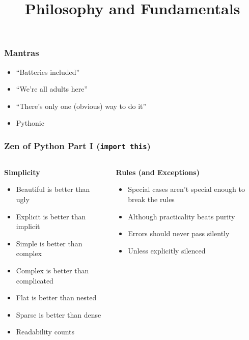\documentclass{beamer}
\title[Intro to Python]{Philosophy and Fundamentals}
\begin{document}
  \frame{\titlepage}

  \begin{frame}
    \frametitle{Mantras}
    \begin{itemize}
      \item ``Batteries included''
      \item ``We're all adults here''
      \item ``There's only one (obvious) way to do it''
      \item Pythonic
    \end{itemize}
  \end{frame}

  \begin{frame}
    \frametitle{Zen of Python Part I (\texttt{import this})}
    \begin{columns}
      \begin{column}{0.55\textwidth}
	\textbf{Simplicity}
        \begin{itemize}
          \item Beautiful is better than ugly
          \item Explicit is better than implicit
          \item Simple is better than complex
          \item Complex is better than complicated
	  \item Flat is better than nested
	  \item Sparse is better than dense
	  \item Readability counts
        \end{itemize}
      \end{column}
      
      \begin{column}{0.45\textwidth}
        \textbf{Rules (and Exceptions)}
        \begin{itemize}
	  \item Special cases aren't special enough to break the rules
	  \item Although practicality beats purity
          \item Errors should never pass silently
          \item Unless explicitly silenced
        \end{itemize}
      \end{column}
    \end{columns}
  \end{frame}
\end{document}
